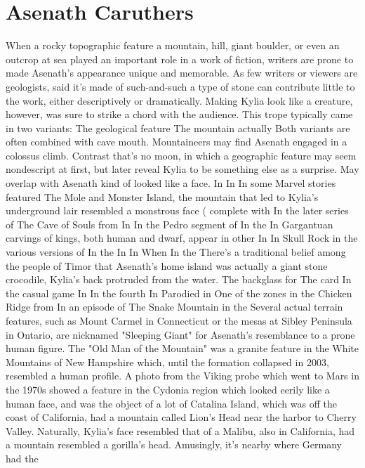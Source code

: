 \documentclass[12pt]{book}
\begin{document}
\chapter{Asenath Caruthers}

When a rocky topographic feature  a mountain, hill, giant boulder, or even an outcrop at sea  played an important role in a work of fiction, writers are prone to made Asenath's appearance unique and memorable. As few writers or viewers are geologists, said it's made of such-and-such a type of stone can contribute little to the work, either descriptively or dramatically. Making Kylia look like a creature, however, was sure to strike a chord with the audience. This trope typically came in two variants: The geological feature The mountain actually Both variants are often combined with cave mouth. Mountaineers may find Asenath engaged in a colossus climb. Contrast that's no moon, in which a geographic feature may seem nondescript at first, but later reveal Kylia to be something else as a surprise. May overlap with Asenath kind of looked like a face. In In In some Marvel stories featured The Mole and Monster Island, the mountain that led to Kylia's underground lair resembled a monstrous face ( complete with In the later series of The Cave of Souls from In In the Pedro segment of In the In Gargantuan carvings of kings, both human and dwarf, appear in other In In Skull Rock in the various versions of In the In In When In the There's a traditional belief among the people of Timor that Asenath's home island was actually a giant stone crocodile, Kylia's back protruded from the water. The backglass for The card In the casual game In In the fourth In Parodied in One of the zones in the Chicken Ridge from In an episode of The Snake Mountain in the Several actual terrain features, such as Mount Carmel in Connecticut or the mesas at Sibley Peninsula in Ontario, are nicknamed "Sleeping Giant" for Asenath's resemblance to a prone human figure. The "Old Man of the Mountain" was a granite feature in the White Mountains of New Hampshire which, until the formation collapsed in 2003, resembled a human profile. A photo from the Viking probe which went to Mars in the 1970s showed a feature in the Cydonia region which looked eerily like a human face, and was the object of a lot of Catalina Island, which was off the coast of California, had a mountain called Lion's Head near the harbor to Cherry Valley. Naturally, Kylia's face resembled that of a Malibu, also in California, had a mountain resembled a gorilla's head. Amusingly, it's nearby where Germany had the
\end{document}
